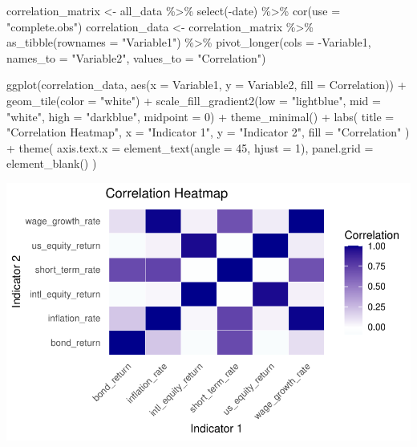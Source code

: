 \documentclass[
  letterpaper,
  DIV=11,
  numbers=noendperiod]{scrartcl}
\newenvironment{Shaded}{\begin{snugshade}}{\end{snugshade}}
\newcommand{\AttributeTok}[1]{\textcolor[rgb]{0.40,0.45,0.13}{#1}}
\newcommand{\DecValTok}[1]{\textcolor[rgb]{0.68,0.00,0.00}{#1}}
\newcommand{\FunctionTok}[1]{\textcolor[rgb]{0.28,0.35,0.67}{#1}}
\newcommand{\NormalTok}[1]{\textcolor[rgb]{0.00,0.23,0.31}{#1}}
\newcommand{\OtherTok}[1]{\textcolor[rgb]{0.00,0.23,0.31}{#1}}
\newcommand{\SpecialCharTok}[1]{\textcolor[rgb]{0.37,0.37,0.37}{#1}}
\newcommand{\StringTok}[1]{\textcolor[rgb]{0.13,0.47,0.30}{#1}}
\begin{document}
\begin{Shaded}
\begin{Highlighting}[]
\NormalTok{correlation\_matrix }\OtherTok{\textless{}{-}}\NormalTok{ all\_data }\SpecialCharTok{\%\textgreater{}\%}
  \FunctionTok{select}\NormalTok{(}\SpecialCharTok{{-}}\NormalTok{date) }\SpecialCharTok{\%\textgreater{}\%}
  \FunctionTok{cor}\NormalTok{(}\AttributeTok{use =} \StringTok{"complete.obs"}\NormalTok{)}
\NormalTok{correlation\_data }\OtherTok{\textless{}{-}}\NormalTok{ correlation\_matrix }\SpecialCharTok{\%\textgreater{}\%}
  \FunctionTok{as\_tibble}\NormalTok{(}\AttributeTok{rownames =} \StringTok{"Variable1"}\NormalTok{) }\SpecialCharTok{\%\textgreater{}\%}
  \FunctionTok{pivot\_longer}\NormalTok{(}\AttributeTok{cols =} \SpecialCharTok{{-}}\NormalTok{Variable1, }\AttributeTok{names\_to =} \StringTok{"Variable2"}\NormalTok{, }\AttributeTok{values\_to =} \StringTok{"Correlation"}\NormalTok{)}

\FunctionTok{ggplot}\NormalTok{(correlation\_data, }\FunctionTok{aes}\NormalTok{(}\AttributeTok{x =}\NormalTok{ Variable1, }\AttributeTok{y =}\NormalTok{ Variable2, }\AttributeTok{fill =}\NormalTok{ Correlation)) }\SpecialCharTok{+}
  \FunctionTok{geom\_tile}\NormalTok{(}\AttributeTok{color =} \StringTok{"white"}\NormalTok{) }\SpecialCharTok{+}
  \FunctionTok{scale\_fill\_gradient2}\NormalTok{(}\AttributeTok{low =} \StringTok{"lightblue"}\NormalTok{, }\AttributeTok{mid =} \StringTok{"white"}\NormalTok{, }\AttributeTok{high =} \StringTok{"darkblue"}\NormalTok{, }\AttributeTok{midpoint =} \DecValTok{0}\NormalTok{) }\SpecialCharTok{+}
  \FunctionTok{theme\_minimal}\NormalTok{() }\SpecialCharTok{+}
  \FunctionTok{labs}\NormalTok{(}
    \AttributeTok{title =} \StringTok{"Correlation Heatmap"}\NormalTok{,}
    \AttributeTok{x =} \StringTok{"Indicator 1"}\NormalTok{,}
    \AttributeTok{y =} \StringTok{"Indicator 2"}\NormalTok{,}
    \AttributeTok{fill =} \StringTok{"Correlation"}
\NormalTok{  ) }\SpecialCharTok{+}
  \FunctionTok{theme}\NormalTok{(}
    \AttributeTok{axis.text.x =} \FunctionTok{element\_text}\NormalTok{(}\AttributeTok{angle =} \DecValTok{45}\NormalTok{, }\AttributeTok{hjust =} \DecValTok{1}\NormalTok{),}
    \AttributeTok{panel.grid =} \FunctionTok{element\_blank}\NormalTok{()}
\NormalTok{  )}
\end{Highlighting}
\end{Shaded}

\includegraphics{mp04_files/figure-pdf/unnamed-chunk-5-1.pdf}
\end{document}
